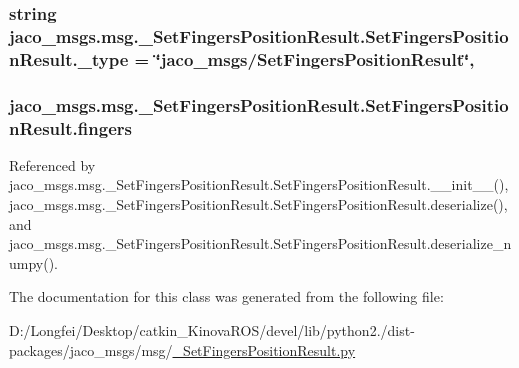 \subsubsection[{\texorpdfstring{\+\_\+type}{_type}}]{\setlength{\rightskip}{0pt plus 5cm}string jaco\+\_\+msgs.\+msg.\+\_\+\+Set\+Fingers\+Position\+Result.\+Set\+Fingers\+Position\+Result.\+\_\+type = \char`\"{}jaco\+\_\+msgs/{\bf Set\+Fingers\+Position\+Result}\char`\"{}\hspace{0.3cm}{\ttfamily [static]}, {\ttfamily [private]}}\hypertarget{classjaco__msgs_1_1msg_1_1__SetFingersPositionResult_1_1SetFingersPositionResult_ae00c6e987fb8b8bad4b6d1056c704126}{}\label{classjaco__msgs_1_1msg_1_1__SetFingersPositionResult_1_1SetFingersPositionResult_ae00c6e987fb8b8bad4b6d1056c704126}
\subsubsection[{\texorpdfstring{fingers}{fingers}}]{\setlength{\rightskip}{0pt plus 5cm}jaco\+\_\+msgs.\+msg.\+\_\+\+Set\+Fingers\+Position\+Result.\+Set\+Fingers\+Position\+Result.\+fingers}\hypertarget{classjaco__msgs_1_1msg_1_1__SetFingersPositionResult_1_1SetFingersPositionResult_a8476169c7617c124b3cb2cfd45e11288}{}\label{classjaco__msgs_1_1msg_1_1__SetFingersPositionResult_1_1SetFingersPositionResult_a8476169c7617c124b3cb2cfd45e11288}


Referenced by jaco\+\_\+msgs.\+msg.\+\_\+\+Set\+Fingers\+Position\+Result.\+Set\+Fingers\+Position\+Result.\+\_\+\+\_\+init\+\_\+\+\_\+(), jaco\+\_\+msgs.\+msg.\+\_\+\+Set\+Fingers\+Position\+Result.\+Set\+Fingers\+Position\+Result.\+deserialize(), and jaco\+\_\+msgs.\+msg.\+\_\+\+Set\+Fingers\+Position\+Result.\+Set\+Fingers\+Position\+Result.\+deserialize\+\_\+numpy().



The documentation for this class was generated from the following file\+:\begin{DoxyCompactItemize}
\item 
D\+:/\+Longfei/\+Desktop/catkin\+\_\+\+Kinova\+R\+O\+S/devel/lib/python2./dist-\/packages/jaco\+\_\+msgs/msg/\hyperlink{__SetFingersPositionResult_8py}{\+\_\+\+Set\+Fingers\+Position\+Result.\+py}\end{DoxyCompactItemize}
